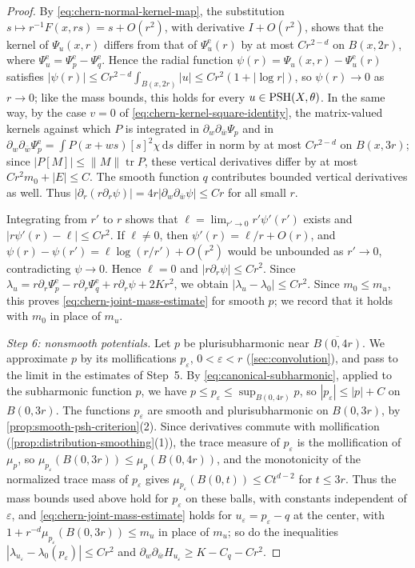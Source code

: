 \begin{proof}
By \eqref{eq:chern-normal-kernel-map}, the substitution $s\mapsto r^{-1}F(x,rs)=s+O(r^2)$, with derivative $I+O(r^2)$, shows that the kernel of $\Psi_u(x,r)$ differs from that of $\Psi^{\mathrm e}_u(r)$ by at most $Cr^{2-d}$ on $B(x,2r)$, where $\Psi^{\mathrm e}_u=\Psi^{\mathrm e}_p-\Psi^{\mathrm e}_q$. Hence the radial function $\psi(r)=\Psi_u(x,r)-\Psi^{\mathrm e}_u(r)$ satisfies $|\psi(r)|\leq Cr^{2-d}\int_{B(x,2r)}|u|\leq Cr^2(1+|\log r|)$, so $\psi(r)\to0$ as $r\to0$; like the mass bounds, this holds for every $u\in\mathrm{PSH}(X,\theta)$. In the same way, by the case $v=0$ of \eqref{eq:chern-kernel-square-identity}, the matrix-valued kernels against which $P$ is integrated in $\partial_w\partial_{\bar w}\Psi_p$ and in $\partial_w\partial_{\bar w}\Psi^{\mathrm e}_p=\int P(x+ws)[s]^2\chi\,\mathrm ds$ differ in norm by at most $Cr^{2-d}$ on $B(x,3r)$; since $|P[M]|\leq\|M\|\operatorname{tr}P$, these vertical derivatives differ by at most $Cr^2m_0+|E|\leq C$. The smooth function $q$ contributes bounded vertical derivatives as well. Thus $|\partial_r(r\partial_r\psi)|=4r|\partial_w\partial_{\bar w}\psi|\leq Cr$ for all small $r$.

Integrating from $r'$ to $r$ shows that $\ell=\lim_{r'\to0}r'\psi'(r')$ exists and $|r\psi'(r)-\ell|\leq Cr^2$. If $\ell\neq0$, then $\psi'(r)=\ell/r+O(r)$, and $\psi(r)-\psi(r')=\ell\log(r/r')+O(r^2)$ would be unbounded as $r'\to0$, contradicting $\psi\to0$. Hence $\ell=0$ and $|r\partial_r\psi|\leq Cr^2$. Since $\lambda_u=r\partial_r\Psi^{\mathrm e}_p-r\partial_r\Psi^{\mathrm e}_q+r\partial_r\psi+2Kr^2$, we obtain $|\lambda_u-\lambda_0|\leq Cr^2$. Since $m_0\leq m_u$, this proves \eqref{eq:chern-joint-mass-estimate} for smooth $p$; we record that it holds with $m_0$ in place of $m_u$.

\emph{Step 6: nonsmooth potentials.} Let $p$ be plurisubharmonic near $\overline{B(0,4r)}$. We approximate $p$ by its mollifications $p_\varepsilon$, $0<\varepsilon<r$ (\cref{sec:convolution}), and pass to the limit in the estimates of Step~5. By \eqref{eq:canonical-subharmonic}, applied to the subharmonic function $p$, we have $p\leq p_\varepsilon\leq\sup_{B(0,4r)}p$, so $|p_\varepsilon|\leq|p|+C$ on $B(0,3r)$. The functions $p_\varepsilon$ are smooth and plurisubharmonic on $B(0,3r)$, by \cref{prop:smooth-psh-criterion}(2). Since derivatives commute with mollification (\cref{prop:distribution-smoothing}(1)), the trace measure of $p_\varepsilon$ is the mollification of $\mu_p$, so $\mu_{p_\varepsilon}(B(0,3r))\leq\mu_p(B(0,4r))$, and the monotonicity of the normalized trace mass of $p_\varepsilon$ gives $\mu_{p_\varepsilon}(B(0,t))\leq Ct^{d-2}$ for $t\leq3r$. Thus the mass bounds used above hold for $p_\varepsilon$ on these balls, with constants independent of $\varepsilon$, and \eqref{eq:chern-joint-mass-estimate} holds for $u_\varepsilon=p_\varepsilon-q$ at the center, with $1+r^{-d}\mu_{p_\varepsilon}(B(0,3r))\leq m_u$ in place of $m_u$; so do the inequalities $|\lambda_{u_\varepsilon}-\lambda_0(p_\varepsilon)|\leq Cr^2$ and $\partial_w\partial_{\bar w}H_{u_\varepsilon}\geq K-C_q-Cr^2$.


\end{proof}
